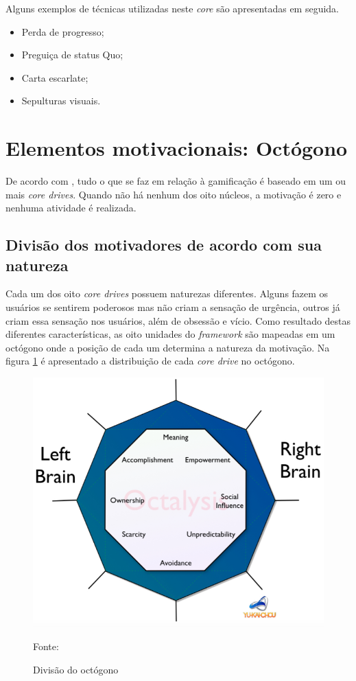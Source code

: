 Alguns exemplos de técnicas utilizadas neste \textit{core} são apresentadas em seguida.

\begin{itemize}
	\item Perda de progresso;
	\item Preguiça de status Quo;
	\item Carta escarlate;
	\item Sepulturas visuais.
\end{itemize}



\section{Elementos motivacionais: Octógono}
De acordo com , tudo o que se faz em relação à gamificação é baseado em um ou mais \textit{core drives}. 
Quando não há nenhum dos oito núcleos, a motivação é zero e nenhuma atividade é realizada.


\subsection{Divisão dos motivadores de acordo com sua natureza}

Cada um dos oito \textit{core drives} possuem naturezas diferentes. Alguns fazem os usuários se sentirem poderosos mas não criam a 
sensação de urgência, outros já criam essa sensação nos usuários, além de obsessão e vício. Como resultado destas diferentes características,
as oito unidades do \textit{framework} são mapeadas em um octógono onde a posição de cada um determina a natureza da motivação. Na figura \ref{octogono1}
é apresentado a distribuição de cada \textit{core drive} no octógono.

\begin{figure}[h]
	\centering
	\includegraphics[keepaspectratio=true,scale=0.34]{figuras/brain.png}
	\caption{Divisão do octógono}
	Fonte: \cite{chou2017actionable}
	\label{octogono1}
\end{figure}

